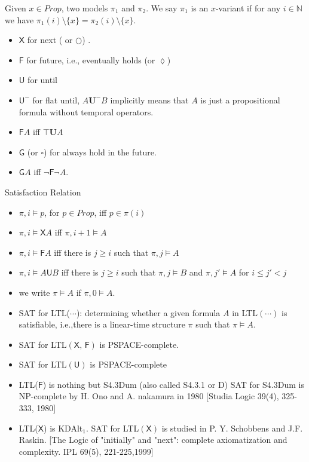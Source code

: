 \documentclass[12pt]{article}
\begin{document}
Given $x\in Prop$, two models $\pi_1$ and $\pi_2$. We say $\pi_1$ is an $x$-variant if for any $i\in\mathbb{N}$ we have $\pi_1(i)\setminus\{x\}=\pi_2(i)\setminus\{x\}$.

\begin{itemize}
\item $\textsf{X}$ for next ( or $\bigcirc$) .
\item $\textsf{F}$ for future, i.e., eventually holds (or $\lozenge$)
\item $\textsf{U}$ for until
\item $\textsf{U}^-$ for flat until, $A\mathbf{U}^-B$ implicitly means that $A$ is just a propositional formula without temporal operators.

\item $\textsf{F}A$ iff $\top\mathbf{U}A$

\item $\textsf{G}$ (or $\square$) for always hold in the future.
\item $\textsf{G}A$ iff $\neg \textsf{F}\neg A$.
\end{itemize}

Satisfaction Relation
\begin{itemize}
\item $\pi, i\models p$, for $p\in Prop$, iff $p\in \pi(i)$
 \item $\pi, i\models \textsf{X}A$ iff $\pi,i+1\models A$
 \item $\pi,i\models \textsf{F}A$ iff there is $j\geq i$ such that $\pi,j\models A$
 \item $\pi,i\models A\textsf{U} B$ iff there is $j\geq i$ such that $\pi,j\models B$ and $\pi,j'\models A$ for $i\leq j'<j$
\item we write $\pi\models A$ if $\pi,0\models A$.

\item SAT for LTL($\cdots$): determining whether a given formula $A$ in LTL$(\cdots)$ is satisfiable, i.e.,there is a linear-time structure $\pi$ such that $\pi\models A$.

\end{itemize}





\begin{itemize}
\item SAT for LTL$(\textsf{X, F})$ is PSPACE-complete.

\item SAT for LTL$(\textsf{U})$ is PSPACE-complete

\item LTL($\textsf{F}$) is nothing but S4.3Dum (also called S4.3.1 or D)
SAT for S4.3Dum is NP-complete by H. Ono and A. nakamura in 1980 [Studia Logic 39(4), 325-333, 1980]

\item LTL($\textsf{X}$) is KDAlt$_1$. SAT for LTL$(\textsf{X})$ is studied in  P. Y. Schobbens and J.F. Raskin. [The Logic of "initially" and "next": complete axiomatization and complexity. IPL 69(5), 221-225,1999]
\end{itemize}
\end{document}

